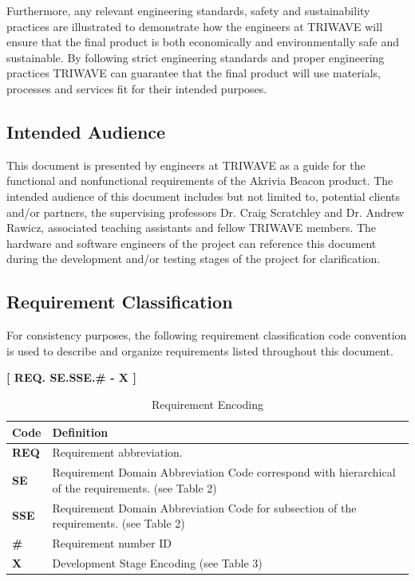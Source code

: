 Furthermore, any relevant engineering standards, safety and sustainability practices are illustrated to demonstrate how the engineers at TRIWAVE will ensure that the final product is both economically and environmentally safe and sustainable. By following strict engineering standards and proper engineering practices TRIWAVE can guarantee that the final product will use materials, processes and services fit for their intended purposes.
\medskip
\medskip
\subsection{Intended Audience}
This document is presented by engineers at TRIWAVE as a guide for the functional and nonfunctional requirements of the Akrivia Beacon product. The intended audience of this document includes but not limited to, potential clients and/or partners, the supervising professors Dr. Craig Scratchley and Dr. Andrew Rawicz, associated teaching assistants and fellow TRIWAVE members. The hardware and software engineers of the project can reference this document during the development and/or testing stages of the project for clarification.
\break



\subsection{Requirement Classification}
\bigskip
For consistency purposes, the following requirement classification code convention is used to describe and organize requirements listed throughout this document. 
\begin{center}
\bigskip
	\textbf{[ REQ. SE.SSE.\# - X ]} 
\end{center}

\bgroup
\def\arraystretch{1.5}
\begin{table}[H]
\centering
\begin{tabular}{ | m{1cm} | m{13cm}| } 
\hline
\textbf{Code} & \textbf{Definition} \\ 
\hline
 \textbf{REQ} & Requirement abbreviation.  \\ 
\hline
 \textbf{SE} & Requirement Domain Abbreviation Code correspond with hierarchical of the requirements. (see Table 2)\\ 
\hline
 \textbf{SSE} & Requirement Domain Abbreviation Code for subsection of the requirements. (see Table 2) \\  
\hline
 \textbf{\#} & Requirement number ID \\ 
\hline
 \textbf{X} & Development Stage Encoding (see Table 3)\\ 
\hline
\end{tabular}
\caption{Requirement Encoding}
\end{table}

